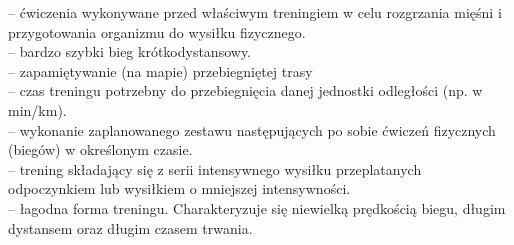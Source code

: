 	-- ćwiczenia wykonywane przed właściwym treningiem w celu rozgrzania mięśni i przygotowania organizmu do wysiłku fizycznego.\\
	-- bardzo szybki bieg krótkodystansowy.\\
	-- zapamiętywanie (na mapie) przebiegniętej trasy\\
	-- czas treningu potrzebny do przebiegnięcia danej jednostki odległości (np. w min/km).\\
	-- wykonanie zaplanowanego zestawu następujących po sobie ćwiczeń fizycznych (biegów) w określonym czasie. \\
	-- trening składający się z serii intensywnego wysiłku przeplatanych odpoczynkiem lub wysiłkiem o mniejszej intensywności.\\
	-- łagodna forma treningu. Charakteryzuje się niewielką prędkością biegu, długim dystansem oraz długim czasem trwania.\\
